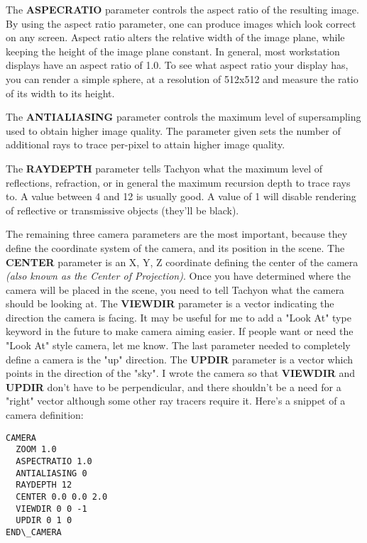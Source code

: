   The {\bf ASPECRATIO} parameter controls the aspect ratio of the resulting
image.  By using the aspect ratio parameter, one can produce images which
look correct on any screen.  Aspect ratio alters the relative width of the
image plane, while keeping the height of the image plane constant.  In 
general, most workstation displays have an aspect ratio of 1.0.  To see
what aspect ratio your display has, you can render a simple sphere, at 
a resolution of 512x512 and measure the ratio of its width to its height. 

The {\bf ANTIALIASING} parameter controls the maximum level of supersampling
used to obtain higher image quality.  The parameter given sets the number of
additional rays to trace per-pixel to attain higher image quality.

  The {\bf RAYDEPTH} parameter tells Tachyon what the maximum
level of reflections, refraction, or in general the maximum recursion
depth to trace rays to.  A value between 4 and 12 is usually good.  A
value of 1 will disable rendering of reflective or transmissive 
objects (they'll be black). 

  The remaining three camera parameters are the most important, because
they define the coordinate system of the camera, and its position in the
scene.  The {\bf CENTER} parameter is an X, Y, Z coordinate defining the 
center of the camera {\em (also known as the Center of Projection)}.
Once you have determined where the camera will be placed in the scene, you
need to tell Tachyon what the camera should be looking at.  The
{\bf VIEWDIR} parameter is a vector indicating the direction the camera
is facing.  It may be useful for me to add a "Look At" type keyword in
the future to make camera aiming easier.  If people want or need the
"Look At" style camera, let me know.  The last parameter needed to completely
define a camera is the "up" direction.  The {\bf UPDIR} parameter is a vector
which points in the direction of the "sky".  I wrote the camera so that
{\bf VIEWDIR} and {\bf UPDIR} don't have to be perpendicular, and there
shouldn't be a need for a "right" vector although some other ray tracers 
require it.  Here's a snippet of a camera definition:
\begin{verbatim}
CAMERA
  ZOOM 1.0
  ASPECTRATIO 1.0
  ANTIALIASING 0
  RAYDEPTH 12
  CENTER 0.0 0.0 2.0
  VIEWDIR 0 0 -1 
  UPDIR 0 1 0
END\_CAMERA 
\end{verbatim}


